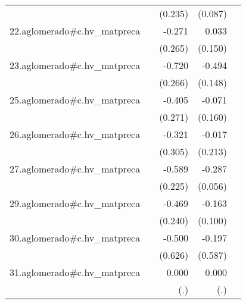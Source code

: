 {\begin{longtable}{l*{4}{D{.}{.}{-1}}}
            &                     &     (0.235)         &     (0.087)         &                     \\
\addlinespace
22.aglomerado#c.hv\_matpreca&                     &      -0.271         &       0.033         &                     \\
            &                     &     (0.265)         &     (0.150)         &                     \\
\addlinespace
23.aglomerado#c.hv\_matpreca&                     &      -0.720\sym{**} &      -0.494\sym{***}&                     \\
            &                     &     (0.266)         &     (0.148)         &                     \\
\addlinespace
25.aglomerado#c.hv\_matpreca&                     &      -0.405         &      -0.071         &                     \\
            &                     &     (0.271)         &     (0.160)         &                     \\
\addlinespace
26.aglomerado#c.hv\_matpreca&                     &      -0.321         &      -0.017         &                     \\
            &                     &     (0.305)         &     (0.213)         &                     \\
\addlinespace
27.aglomerado#c.hv\_matpreca&                     &      -0.589\sym{**} &      -0.287\sym{***}&                     \\
            &                     &     (0.225)         &     (0.056)         &                     \\
\addlinespace
29.aglomerado#c.hv\_matpreca&                     &      -0.469         &      -0.163         &                     \\
            &                     &     (0.240)         &     (0.100)         &                     \\
\addlinespace
30.aglomerado#c.hv\_matpreca&                     &      -0.500         &      -0.197         &                     \\
            &                     &     (0.626)         &     (0.587)         &                     \\
\addlinespace
31.aglomerado#c.hv\_matpreca&                     &       0.000         &       0.000         &                     \\
            &                     &         (.)         &         (.)         &                     \\

\end{longtable}}
